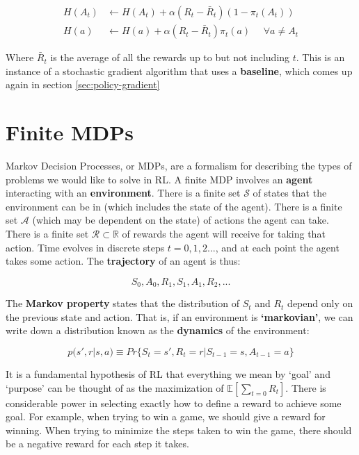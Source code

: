 \documentclass[11pt]{report}
\begin{document}
\begin{align}
	\label{eqn:bandit-stochastic-gradient}
	H(A_t) &\xleftarrow{} H(A_t) + \alpha(R_t - \bar{R}_t)(1-\pi_t(A_t))\\
	H(a) &\xleftarrow{} H(a) + \alpha(R_t - \bar{R}_t)\pi_t(a) \ \ \ \ \ \ \forall a \neq A_t
\end{align}

Where $\bar{R}_t$ is the average of all the rewards up to but not including $t$. This is an instance of a stochastic gradient algorithm that uses a \textbf{baseline}, which comes up again in section \autoref{sec:policy-gradient}


\chapter{Finite MDPs}
Markov Decision Processes, or MDPs, are a formalism for describing the types of problems we would like to solve in RL. A finite MDP involves an \textbf{agent} interacting with an \textbf{environment}. There is a finite set $\mathcal{S}$ of states that the environment can be in (which includes the state of the agent). There is a finite set $\mathcal{A}$ (which may be dependent on the state) of actions the agent can take. There is a finite set $\mathcal{R} \subset \mathbb{R}$ of rewards the agent will receive for taking that action. Time evolves in discrete steps $t = 0, 1, 2...$, and at each point the agent takes some action. The \textbf{trajectory} of an agent is thus:

\begin{equation}
	\label{eqn:mdp-trajectory}
	S_0, A_0, R_1, S_1, A_1, R_2, ...
\end{equation}


The \textbf{Markov property} states that the distribution of $S_t$ and $R_t$ depend only on the previous state and action. That is, if an environment is \textbf{`markovian'}, we can write down a distribution known as the \textbf{dynamics} of the environment:

\begin{equation}
	\label{eqn:mdp-dynamics}
	p(s', r | s, a) \equiv Pr\{S_t = s', R_t = r | S_{t-1} =s, A_{t-1} = a\}
\end{equation}

It is a fundamental hypothesis of RL that everything we mean by `goal' and `purpose' can be thought of as the maximization of $\mathbb{E}[\sum_{t=0}{R_t}]$. There is considerable power in selecting exactly how to define a reward to achieve some goal. For example, when trying to win a game, we should give a reward for winning. When trying to minimize the steps taken to win the game, there should be a negative reward for each step it takes.
\end{document}
